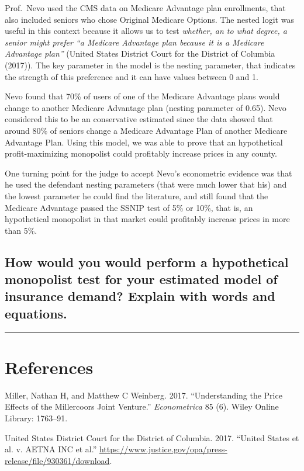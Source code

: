 \documentclass[]{article}
\begin{document}
Prof.~Nevo used the CMS data on Medicare Advantage plan enrollments,
that also included seniors who chose Original Medicare Options. The
nested logit was useful in this context because it allows us to test
\emph{whether, an to what degree, a senior might prefer ``a Medicare
Advantage plan because it is a Medicare Advantage plan''} (United States
District Court for the District of Columbia (2017)). The key parameter
in the model is the nesting parameter, that indicates the strength of
this preference and it can have values between 0 and 1.

Nevo found that 70\% of users of one of the Medicare Advantage plans
would change to another Medicare Advantage plan (nesting parameter of
0.65). Nevo considered this to be an conservative estimated since the
data showed that around 80\% of seniors change a Medicare Advantage Plan
of another Medicare Advantage Plan. Using this model, we was able to
prove that an hypothetical profit-maximizing monopolist could profitably
increase prices in any county.

One turning point for the judge to accept Nevo's econometric evidence
was that he used the defendant nesting parameters (that were much lower
that his) and the lowest parameter he could find the literature, and
still found that the Medicare Advantage passed the SSNIP test of 5\% or
10\%, that is, an hypothetical monopolist in that market could
profitably increase prices in more than 5\%.

\hypertarget{how-would-you-would-perform-a-hypothetical-monopolist-test-for-your-estimated-model-of-insurance-demand-explain-with-words-and-equations.}{%
\subsection{How would you would perform a hypothetical monopolist test
for your estimated model of insurance demand? Explain with words and
equations.}\label{how-would-you-would-perform-a-hypothetical-monopolist-test-for-your-estimated-model-of-insurance-demand-explain-with-words-and-equations.}}

\begin{center}\rule{0.5\linewidth}{\linethickness}\end{center}

\hypertarget{references}{%
\section*{References}\label{references}}

\hypertarget{refs}{}
\leavevmode\hypertarget{ref-miller2017}{}%
Miller, Nathan H, and Matthew C Weinberg. 2017. ``Understanding the
Price Effects of the Millercoors Joint Venture.'' \emph{Econometrica} 85
(6). Wiley Online Library: 1763--91.

\leavevmode\hypertarget{ref-aetna}{}%
United States District Court for the District of Columbia. 2017.
``United States et al. v. AETNA INC et al.''
\url{https://www.justice.gov/opa/press-release/file/930361/download}.
\end{document}

